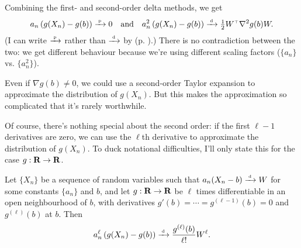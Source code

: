 \documentclass[11pt,letterpaper,reqno,oneside]{article}
\begin{document}
\begin{remark}
	Combining the first- and second-order delta methods, we get
	\begin{equation*}
		a_n \left( g(X_n) - g(b) \right)
		\xrightarrow{{\scriptscriptstyle \mathrm{\;p\;}}} 0
		\quad\text{and}\quad
		a_n^2 \left( g(X_n) - g(b) \right)
		\xrightarrow{{\scriptscriptstyle \mathrm{\;d\;}}} \tfrac{1}{2} W^{\scriptscriptstyle \top} \nabla^2 g(b) W .
	\end{equation*}
	(I can write $\xrightarrow{{\scriptscriptstyle \mathrm{\;p\;}}}$ rather than $\xrightarrow{{\scriptscriptstyle \mathrm{\;d\;}}}$ by  (p. \pageref{proposition:convd_convp}).) There is no contradiction between the two: we get different behaviour because we're using different scaling factors ($\{ a_n \}$ vs. $\{ a_n^2 \}$).
\end{remark}


\begin{remark}
	Even if $\nabla g(b) \neq 0$, we could use a second-order Taylor expansion to approximate the distribution of $g(X_n)$. But this makes the approximation so complicated that it's rarely worthwhile.
\end{remark}


Of course, there's nothing special about the second order: if the first $\ell-1$ derivatives are zero, we can use the $\ell$th derivative to approximate the distribution of $g(X_n)$. To duck notational difficulties, I'll only state this for the case $g : \mathbf{R} \to \mathbf{R}$.
%
\begin{proposition}
	Let $\{ X_n \}$ be a sequence of random variables such that $a_n ( X_n - b ) \xrightarrow{{\scriptscriptstyle \mathrm{\;d\;}}} W$ for some constants $\{ a_n \}$ and $b$, and let $g: \mathbf{R} \to \mathbf{R}$ be $\ell$ times differentiable in an open neighbourhood of $b$, with derivatives $g'(b)=\cdots=g^{(\ell-1)}(b)=0$ and $g^{(\ell)}(b)$ at $b$. Then
	\begin{equation*}
		a_n^\ell \left( g(X_n) - g(b) \right)
		\xrightarrow{{\scriptscriptstyle \mathrm{\;d\;}}} \frac{g^{(\ell)}(b)}{\ell !} W^\ell .
	\end{equation*}
\end{proposition}
\end{document}
